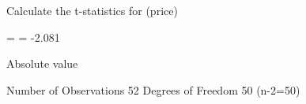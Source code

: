 
Calculate the t-statistics for  (price)

  =   = -2.081

Absolute value

Number of Observations 52
Degrees of Freedom 50 (n-2=50)
